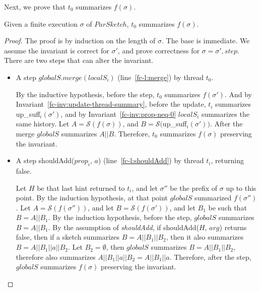 Next, we prove that $t_0$ summarizes $f(\sigma)$.
\begin{invariant}
    Given a finite execution $\sigma$ of $ParSketch$, $t_0$ summarizes $f(\sigma)$.
    \label{fc-inv:G-partial-summary}
\end{invariant}
\begin{proof}
    The proof is by induction on the length of $\sigma$. The base is immediate.
    We assume the invariant is correct for $\sigma'$, and prove correctness for $\sigma=\sigma',step$.
    There are two steps that can alter the invariant.
    \begin{itemize}
        \item A step $globalS.merge(localS_i)$ (line~\ref{fc-l:merge}) by thread $t_0$.
        
        By the inductive hypothesis, before the step, $t_0$ summarizes $f(\sigma')$. And by
        Invariant~\ref{fc-inv:update-thread-summary}, before the update, $t_i$ summarizes
        up\_suff$_i(\sigma')$, and by Invariant~\ref{fc-inv:prop-neq-0} $localS_i$ summarizes the same history.
        Let $A={\mathcal{S}}(f(\sigma))$, and $B={\mathcal{S}}($up\_suff$_i(\sigma')$$)$.
        After the merge $globalS$ summarizes $A||B$. Therefore,
        $t_0$ summarizes $f(\sigma)$ preserving the invariant.

        \item A step shouldAdd($prop_i$, $a$) (line~\ref{fc-l:shouldAdd}) by thread $t_i$, returning false.     
        
        Let $H$ be that last hint returned to $t_i$, and let $\sigma''$ be the prefix of $\sigma$ up to this point.
        By the induction hypothesis, at that point $globalS$ summarized $f(\sigma'')$.
        Let $A=\mathcal{S}$$(f(\sigma''))$, and let $B=\mathcal{S}$$(f(\sigma'))$,
        and let $B_1$ be such that $B=A||B_1$. By the induction hypothesis,
        before the step, $globalS$ summarizes $B=A||B_1$.
        By the assumption of \emph{shouldAdd}, if shouldAdd($H$, $arg$) returns false, then if
        a sketch summarizes $B=A||B_1||B_2$, then it also summarizes $B=A||B_1||a||B_2$. Let
        $B_2=\emptyset$, then $globalS$ summarizes $B=A||B_1||B_2$, therefore also summarizes 
        $A||B_1||a||B_2=A||B_1||a$. Therefore, after the step, $globalS$ summarizes $f(\sigma)$
        preserving the invariant.
    \end{itemize}
\end{proof}

